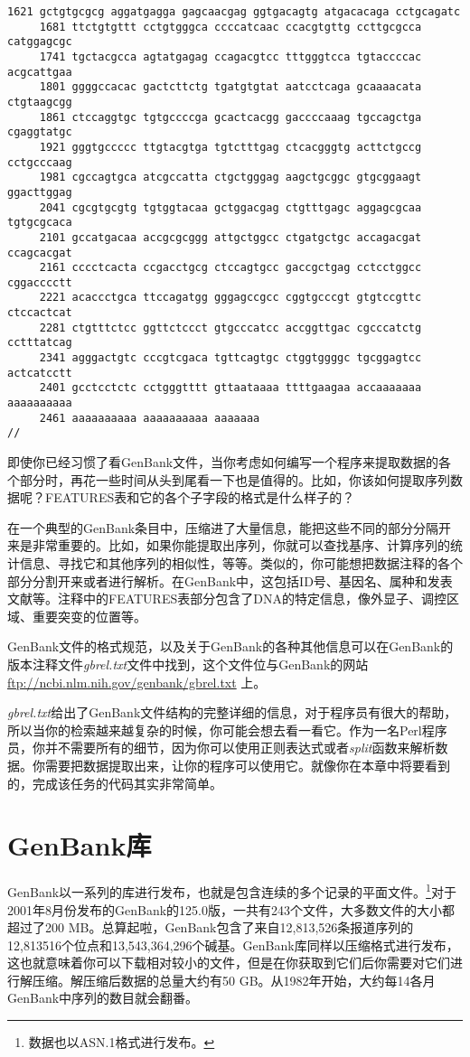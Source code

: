 \begin{lstlisting}[language={},basicstyle=\small\tt,breaklines=false]
     1621 gctgtgcgcg aggatgagga gagcaacgag ggtgacagtg atgacacaga cctgcagatc
     1681 ttctgtgttt cctgtgggca ccccatcaac ccacgtgttg ccttgcgcca catggagcgc
     1741 tgctacgcca agtatgagag ccagacgtcc tttgggtcca tgtaccccac acgcattgaa
     1801 ggggccacac gactcttctg tgatgtgtat aatcctcaga gcaaaacata ctgtaagcgg
     1861 ctccaggtgc tgtgccccga gcactcacgg gaccccaaag tgccagctga cgaggtatgc
     1921 gggtgccccc ttgtacgtga tgtctttgag ctcacgggtg acttctgccg cctgcccaag
     1981 cgccagtgca atcgccatta ctgctgggag aagctgcggc gtgcggaagt ggacttggag
     2041 cgcgtgcgtg tgtggtacaa gctggacgag ctgtttgagc aggagcgcaa tgtgcgcaca
     2101 gccatgacaa accgcgcggg attgctggcc ctgatgctgc accagacgat ccagcacgat
     2161 cccctcacta ccgacctgcg ctccagtgcc gaccgctgag cctcctggcc cggacccctt
     2221 acaccctgca ttccagatgg gggagccgcc cggtgcccgt gtgtccgttc ctccactcat
     2281 ctgtttctcc ggttctccct gtgcccatcc accggttgac cgcccatctg cctttatcag
     2341 agggactgtc cccgtcgaca tgttcagtgc ctggtggggc tgcggagtcc actcatcctt
     2401 gcctcctctc cctgggtttt gttaataaaa ttttgaagaa accaaaaaaa aaaaaaaaaa
     2461 aaaaaaaaaa aaaaaaaaaa aaaaaaa
//
\end{lstlisting}

即使你已经习惯了看GenBank文件，当你考虑如何编写一个程序来提取数据的各个部分时，再花一些时间从头到尾看一下也是值得的。比如，你该如何提取序列数据呢？FEATURES表和它的各个子字段的格式是什么样子的？

在一个典型的GenBank条目中，压缩进了大量信息，能把这些不同的部分分隔开来是非常重要的。比如，如果你能提取出序列，你就可以查找基序、计算序列的统计信息、寻找它和其他序列的相似性，等等。类似的，你可能想把数据注释的各个部分分割开来或者进行解析。在GenBank中，这包括ID号、基因名、属种和发表文献等。注释中的FEATURES表部分包含了DNA的特定信息，像外显子、调控区域、重要突变的位置等。

GenBank文件的格式规范，以及关于GenBank的各种其他信息可以在GenBank的版本注释文件\textit{gbrel.txt}文件中找到，这个文件位与GenBank的网站 \href{ftp://ncbi.nlm.nih.gov/genbank/gbrel.txt}{ftp://ncbi.nlm.nih.gov/genbank/gbrel.txt} 上。

\textit{gbrel.txt}给出了GenBank文件结构的完整详细的信息，对于程序员有很大的帮助，所以当你的检索越来越复杂的时候，你可能会想去看一看它。作为一名Perl程序员，你并不需要所有的细节，因为你可以使用正则表达式或者\textit{split}函数来解析数据。你需要把数据提取出来，让你的程序可以使用它。就像你在本章中将要看到的，完成该任务的代码其实非常简单。

\section{GenBank库}
GenBank以一系列的库进行发布，也就是包含连续的多个记录的平面文件。\footnote{数据也以ASN.1格式进行发布。}对于2001年8月份发布的GenBank的125.0版，一共有243个文件，大多数文件的大小都超过了200
MB。总算起啦，GenBank包含了来自12,813,526条报道序列的12,813516个位点和13,543,364,296个碱基。GenBank库同样以压缩格式进行发布，这也就意味着你可以下载相对较小的文件，但是在你获取到它们后你需要对它们进行解压缩。解压缩后数据的总量大约有50 GB。从1982年开始，大约每14各月GenBank中序列的数目就会翻番。

